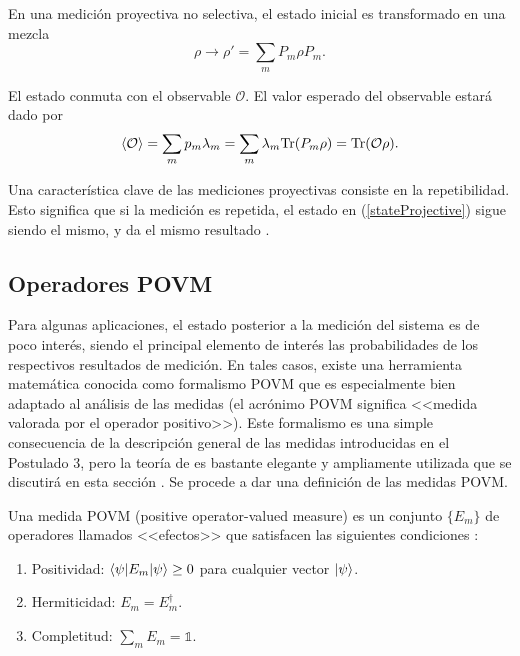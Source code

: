  En una medición proyectiva no selectiva, el estado inicial es transformado en
una mezcla  
\begin{equation}
	\rho \to \rho'=\sum_m P_m \rho P_m.
\end{equation} 


El estado conmuta con el observable $\mathcal{O}$. El valor esperado del
observable estará dado por 
\begin{equation}
	\langle \mathcal{O} \rangle=\sum_m p_m\lambda_m=\sum_m \lambda_m
{\rm Tr}(P_m\rho)={\rm Tr}(\mathcal{O}\rho).
\end{equation}

Una característica clave de las mediciones proyectivas consiste en la
repetibilidad. Esto significa que si la medición es repetida, el estado en
({\ref{stateProjective}}) sigue siendo el mismo, y da el mismo resultado
{\cite{2007geometry}}.
\subsection{Operadores POVM}\label{operadoresPOVM} %


Para algunas aplicaciones, el estado posterior a la medición del sistema es de poco interés, siendo el
principal elemento de interés las probabilidades de los respectivos resultados
de medición. En tales casos, existe una herramienta matemática conocida como
formalismo POVM que es especialmente bien adaptado al análisis de las medidas
(el acrónimo POVM significa <<medida valorada por el operador positivo>>). Este
formalismo es una simple consecuencia de la descripción general de las medidas
introducidas en el Postulado 3, pero la teoría de es bastante elegante y
ampliamente utilizada que se discutirá en esta sección
{\cite{nielsen_chuang_2010}}. Se procede a dar una definición de las medidas
POVM\@. 

\begin{definition} Una medida POVM (positive operator-valued measure) es un conjunto $\{E_{m}\}$ de operadores llamados <<efectos>> que satisfacen las siguientes condiciones {\cite{2007geometry}}:
	\begin{enumerate}
		\item Positividad: $\langle \psi |E_m|\psi \rangle \ge 0 $ para cualquier vector $|\psi\rangle$.
		\item Hermiticidad: $E_m=E_{m}^\dagger$.
		\item  Completitud: $\sum_m E_m =\mathds{1}$.
	\end{enumerate}
\end{definition}

